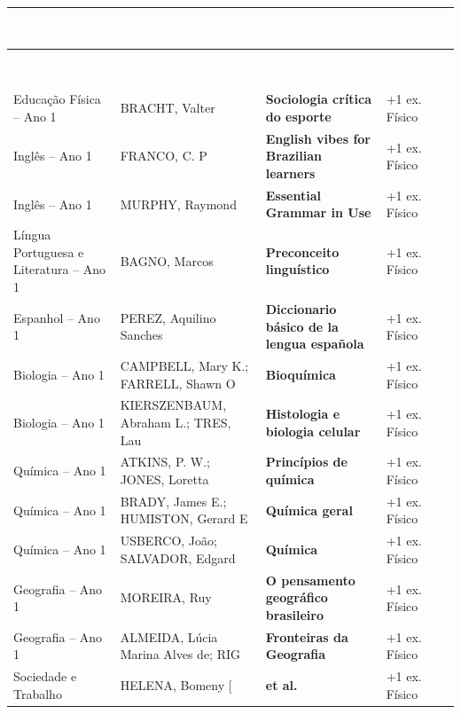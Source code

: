 \documentclass[10pt,a4paper]{article}
\begin{document}
\vspace{0.2cm}
\begin{xltabular}{\linewidth}{|p{3.8cm}|p{3.2cm}|X|p{2.2cm}|}
\hline
{}
\textcolor{white}{\textbf{Unidade Curricular}} & \textcolor{white}{\textbf{Autor Principal}} & \textcolor{white}{\textbf{Título da Obra}} & \textcolor{white}{\textbf{Demanda}} \\ \hline
\endfirsthead
\hline
{}
\textcolor{white}{\textbf{Unidade Curricular}} & \textcolor{white}{\textbf{Autor Principal}} & \textcolor{white}{\textbf{Título da Obra}} & \textcolor{white}{\textbf{Demanda}} \\ \hline
\endhead
Educação Física -- Ano 1 & BRACHT, Valter & \textbf{Sociologia crítica do esporte} & +1 ex. Físico \\ \hline
Inglês -- Ano 1 & FRANCO, C. P & \textbf{English vibes for Brazilian learners} & +1 ex. Físico \\ \hline
Inglês -- Ano 1 & MURPHY, Raymond & \textbf{Essential Grammar in Use} & +1 ex. Físico \\ \hline
Língua Portuguesa e Literatura -- Ano 1 & BAGNO, Marcos & \textbf{Preconceito linguístico} & +1 ex. Físico \\ \hline
Espanhol -- Ano 1 & PEREZ, Aquilino Sanches & \textbf{Diccionario básico de la lengua española} & +1 ex. Físico \\ \hline
Biologia -- Ano 1 & CAMPBELL, Mary K.; FARRELL, Shawn O & \textbf{Bioquímica} & +1 ex. Físico \\ \hline
Biologia -- Ano 1 & KIERSZENBAUM, Abraham L.; TRES, Lau & \textbf{Histologia e biologia celular} & +1 ex. Físico \\ \hline
Química -- Ano 1 & ATKINS, P. W.; JONES, Loretta & \textbf{Princípios de química} & +1 ex. Físico \\ \hline
Química -- Ano 1 & BRADY, James E.; HUMISTON, Gerard E & \textbf{Química geral} & +1 ex. Físico \\ \hline
Química -- Ano 1 & USBERCO, João; SALVADOR, Edgard & \textbf{Química} & +1 ex. Físico \\ \hline
Geografia -- Ano 1 & MOREIRA, Ruy & \textbf{O pensamento geográfico brasileiro} & +1 ex. Físico \\ \hline
Geografia -- Ano 1 & ALMEIDA, Lúcia Marina Alves de; RIG & \textbf{Fronteiras da Geografia} & +1 ex. Físico \\ \hline
Sociedade e Trabalho & HELENA, Bomeny [ & \textbf{et al.} & +1 ex. Físico \\ \hline

\end{xltabular}
\end{document}
